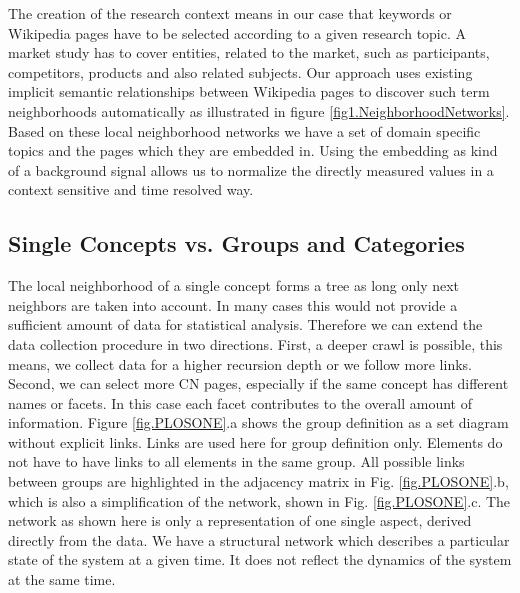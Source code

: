 \documentclass[a4paper,10pt]{scrbook}
\begin{document}
The creation of the research context means in our case that keywords or Wikipedia pages have to be selected according to a given research topic. A market study has to cover entities, related to the market, such as participants, competitors, products and also related subjects. Our approach uses existing implicit semantic relationships between Wikipedia pages to discover such term neighborhoods automatically as illustrated in figure \ref{fig1.NeighborhoodNetworks}. Based on  
these local neighborhood networks we have a set of domain specific topics and the pages which  
they are embedded in. Using the embedding as kind of a background signal allows us to normalize the directly measured values in a context sensitive and time resolved way. 

\subsection{Single Concepts vs. Groups and Categories}
The local neighborhood of a single concept forms a tree as long only next neighbors are taken into account. In many cases this would not provide a sufficient amount of data for statistical analysis. Therefore we can extend the data collection procedure in two directions. First, a deeper crawl is possible, this means, we collect data for a higher recursion depth or we follow more links. Second, we can select more CN pages, especially if the same concept has different names or facets. In this case each facet contributes to the overall amount of information. Figure \ref{fig.PLOSONE}.a shows the group definition as a set diagram without explicit links. Links are used here for group definition only. Elements do not have to have links to all elements in the same group. All possible links between groups are highlighted in the adjacency matrix in Fig. \ref{fig.PLOSONE}.b, which is also a simplification of the network, shown in Fig. \ref{fig.PLOSONE}.c. The network as shown here is only a representation of one single aspect, derived directly from the data. We have a structural network which describes a particular state of the system at a given time. It does not reflect the dynamics of the system at the same time. 
\end{document}
